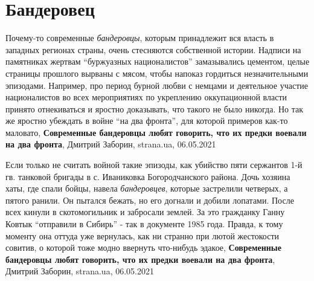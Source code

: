  
 
 
 
 
\chapter{Бандеровец}

Почему-то современные \emph{бандеровцы}, которым принадлежит вся власть в западных
регионах страны, очень стесняются собственной истории. Надписи на памятниках
жертвам \enquote{буржуазных националистов} замазывались цементом, целые страницы
прошлого вырваны с мясом, чтобы напоказ гордиться незначительными эпизодами.
Например, про период бурной любви с немцами и деятельное участие националистов
во всех мероприятиях по укреплению оккупационной власти принято отнекиваться и
яростно доказывать, что такого не было никогда. Но так же яростно убеждать в
войне \enquote{на два фронта}, для которой примеров как-то маловато,
\textbf{Современные бандеровцы любят говорить, что их предки воевали на два фронта},
Дмитрий Заборин, strana.ua, 06.05.2021

Если только не считать войной такие эпизоды, как убийство пяти сержантов 1-й
гв. танковой бригады в с. Иваниковка Богородчанского района. Дочь хозяина хаты,
где спали бойцы, навела \emph{бандеровцев}, которые застрелили четверых, а пятого
ранили. Он пытался бежать, но его догнали и добили лопатами. После всех кинули
в скотомогильник и забросали землей.  За это гражданку Ганну Ковтык
\enquote{отправили в Сибирь} - так в документе 1985 года. Правда, к тому
моменту она оттуда уже вернулась, как ни странно при лютой жестокости совитив,
о которой тоже модно ввернуть что-нибудь эдакое,
\textbf{Современные бандеровцы любят говорить, что их предки воевали на два фронта},
Дмитрий Заборин, strana.ua, 06.05.2021


